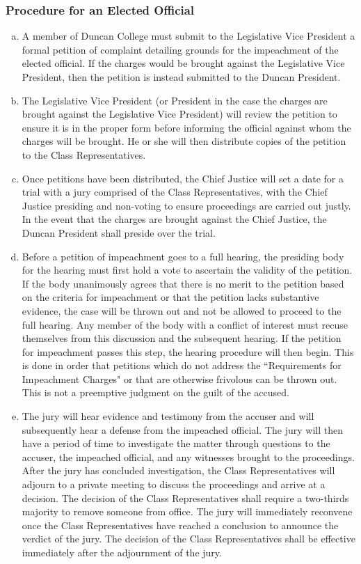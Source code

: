 \documentclass[USletter,12pt]{article}
\begin{document}
\subsubsection{Procedure for an Elected Official}
\begin{enumerate}[(a)]
\item A member of Duncan College must submit to the Legislative Vice President a formal petition of complaint detailing grounds for the impeachment of the elected official.  If the charges would be brought against the Legislative Vice President, then the petition is instead submitted to the Duncan President.
\item The Legislative Vice President (or President in the case the charges are brought against the Legislative Vice President) will review the petition to ensure it is in the proper form before informing the official against whom the charges will be brought.  He or she will then distribute copies of the petition to the Class Representatives.
\item Once petitions have been distributed, the Chief Justice will set a date for a trial with a jury comprised of the Class Representatives, with the Chief Justice presiding and non-voting to ensure proceedings are carried out justly.  In the event that the charges are brought against the Chief Justice, the Duncan President shall preside over the trial.
\item Before a petition of impeachment goes to a full hearing, the presiding body for the hearing must first hold a vote to ascertain the validity of the petition. If the body unanimously agrees that there is no merit to the petition based on the criteria for impeachment or that the petition lacks substantive evidence, the case will be thrown out and not be allowed to proceed to the full hearing. Any member of the body with a conflict of interest must recuse themselves from this discussion and the subsequent hearing. If the petition for impeachment passes this step, the hearing procedure will then begin.  This is done in order that petitions which do not address the ``Requirements for Impeachment Charges" or that are otherwise frivolous can be thrown out.  This is not a preemptive judgment on the guilt of the accused.
\item The jury will hear evidence and testimony from the accuser and will subsequently hear a defense from the impeached official. The jury will then have a period of time to investigate the matter through questions to the accuser, the impeached official, and any witnesses brought to the proceedings. After the jury has concluded investigation, the Class Representatives will adjourn to a private meeting to discuss the proceedings and arrive at a decision. The decision of the Class Representatives shall require a two-thirds majority to remove someone from office. The jury will immediately reconvene once the Class Representatives have reached a conclusion to announce the verdict of the jury. The decision of the Class Representatives shall be effective immediately after the adjournment of the jury.

\end{enumerate}
\end{document}
